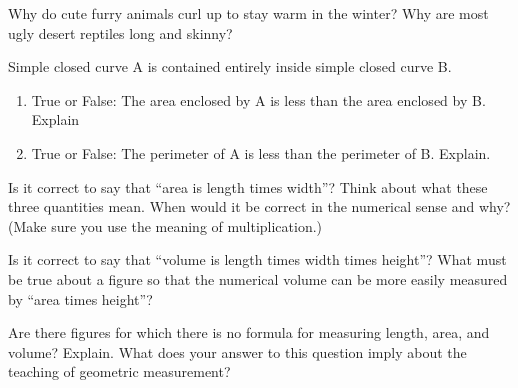\begin{prob}
Why do cute furry animals curl up to stay warm in the winter?  Why are most ugly desert reptiles long and skinny?
\end{prob}

\begin{prob}Simple closed curve A is contained entirely inside simple closed curve B.  
\begin{enumerate}
\item True or False:  The area enclosed by A is less than the area enclosed by B. Explain
\item True or False:  The perimeter of A is less than the perimeter of B. Explain.  
\end{enumerate}
\end{prob}

\begin{prob}
Is it correct to say that ``area is length times width''?  Think about what these three quantities mean.  When would it be correct in the numerical sense and why?  (Make sure you use the meaning of multiplication.)   
\end{prob}


\begin{prob}
 Is it correct to say that ``volume is length times width times height''? What must be true about a figure so that the numerical volume can be more easily measured by ``area times height''?
\end{prob}

\begin{prob}
Are there figures for which there is no formula for measuring length, area, and volume?  Explain.  What does your answer to this question imply about the teaching of geometric measurement?
\end{prob}

